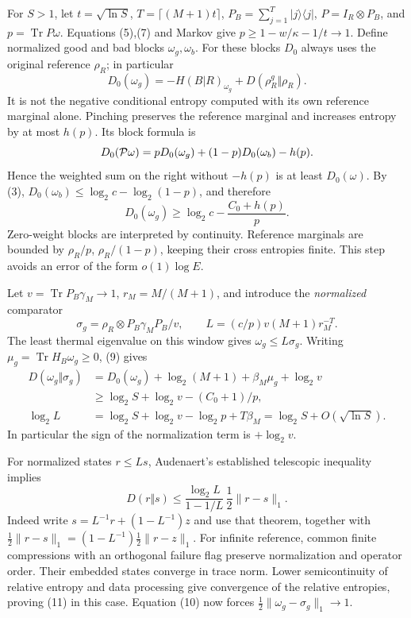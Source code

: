 \documentclass[11pt]{article}
\newcommand{\Tr}{\operatorname{Tr}}
\begin{document}
For \(S>1\), let \(t=\sqrt{\ln S}\), \(T=\lceil(M+1)t\rceil\),
\(P_B=\sum_{j=1}^T|j\rangle\langle j|\), \(P=I_R\otimes P_B\),
and \(p=\Tr P\omega\). Equations (5),(7) and Markov give
\(p\ge1-w/\kappa-1/t\to1\).
Define normalized good and bad blocks \(\omega_g,\omega_b\).
For these blocks \(D_0\) always uses the original reference \(\rho_R\);
in particular
\[
 D_0(\omega_g)=-H(B|R)_{\omega_g}
                 +D(\rho_R^g\Vert\rho_R).
\]
It is not the negative conditional entropy computed with its own
reference marginal alone.
Pinching preserves the reference marginal and increases entropy by at
most \(h(p)\). Its block formula is
\[
 D_0({\cal P}\omega)=pD_0(\omega_g)+(1-p)D_0(\omega_b)-h(p).
\]
Hence the weighted sum on the right without \(-h(p)\) is at least
\(D_0(\omega)\). By (3),
\(D_0(\omega_b)\le\log_2c-\log_2(1-p)\), and therefore
\[
 D_0(\omega_g)\ge\log_2c-\frac{C_0+h(p)}p.                   \tag{9}
\]
Zero-weight blocks are interpreted by continuity. Reference marginals
are bounded by \(\rho_R/p\), \(\rho_R/(1-p)\), keeping their cross
entropies finite. This step avoids an error of the form \(o(1)\log E\).

Let \(v=\Tr P_B\gamma_M\to1\), \(r_M=M/(M+1)\), and introduce the
\emph{normalized} comparator
\[
 \sigma_g=\rho_R\otimes P_B\gamma_M P_B/v,\qquad
 L=(c/p)v(M+1)r_M^{-T}.
\]
The least thermal eigenvalue on this window gives \(\omega_g\le L\sigma_g\).
Writing \(\mu_g=\Tr H_B\omega_g\ge0\), (9) gives
\[
\begin{split}
 D(\omega_g\Vert\sigma_g)
 &=D_0(\omega_g)+\log_2(M+1)+\beta_M\mu_g+\log_2v\\
 &\ge\log_2S+\log_2v-(C_0+1)/p,\\
 \log_2L&=\log_2S+\log_2v-\log_2p+T\beta_M
          =\log_2S+O(\sqrt{\ln S}).
\end{split}                                                  \tag{10}
\]
In particular the sign of the normalization term is \(+\log_2v\).

For normalized states \(r\le Ls\), Audenaert's established telescopic
inequality \cite[Theorem~4]{audenaert} implies
\[
 D(r\Vert s)\le\frac{\log_2L}{1-1/L}\,
                    \frac12\|r-s\|_1.                      \tag{11}
\]
Indeed write \(s=L^{-1}r+(1-L^{-1})z\) and use that theorem, together
with \(\tfrac12\|r-s\|_1=(1-L^{-1})\tfrac12\|r-z\|_1\).
For infinite reference, common finite compressions with an orthogonal
failure flag preserve normalization and operator order. Their embedded
states converge in trace norm. Lower semicontinuity of relative entropy
and data processing give convergence of the relative entropies, proving
(11) in this case. Equation (10) now forces
\(\frac12\|\omega_g-\sigma_g\|_1\to1\).
\end{document}
